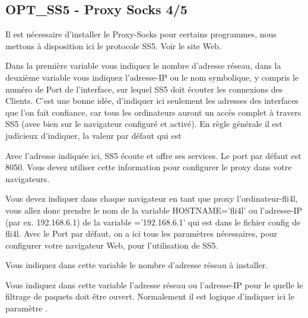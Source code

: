 \subsection{OPT\_SS5 - Proxy Socks 4/5 }

Il est nécessaire d'installer le Proxy-Socks pour certains programmes, nous
mettons à disposition ici le protocole SS5. Voir le site Web.


\begin{description}


        {Dans la première variable vous indiquez le nombre d'adresse réseau, dans
        la deuxième variable vous indiquez l'adresse-IP ou le nom symbolique,
        y compris le numéro de Port de l'interface, sur lequel SS5 doit écouter
        les connexions des Clients. C'est une bonne idée, d'indiquer ici seulement
        les adresses des interfaces que l'on fait confiance, car tous les
        ordinateurs auront un accès complet à travers SS5 (avec bien sur le
        navigateur configuré et activé). En règle générale il est judicieux
        d'indiquer, la valeur par défaut qui est 

        Avec l'adresse indiquée ici, SS5 écoute et offre ses services. Le port
        par défaut est 8050. Vous devez utiliser cette information pour configurer
        le proxy dans votre navigateurs.

        Vous devez indiquer dans chaque navigateur en tant que proxy
        l'ordinateur-fli4l, vous allez donc prendre le nom de la variable
        HOSTNAME='fli4l' ou l'adresse-IP (par ex. 192.168.6.1) de la variable
        ='192.168.6.1' qui est dans le fichier config de
        fli4l. Avec le Port par défaut, on a ici tous les paramètres nécessaires,
        pour configurer votre navigateur Web, pour l'utilisation de SS5.}


        {Vous indiquez dans cette variable le nombre d'adresse réseau à installer.}


        Vous indiquez dans cette variable l'adresse réseau ou l'adresse-IP pour
        le quelle le filtrage de paquets doit être ouvert. Normalement il est
        logique d'indiquer ici le paramètre .
\end{description}
